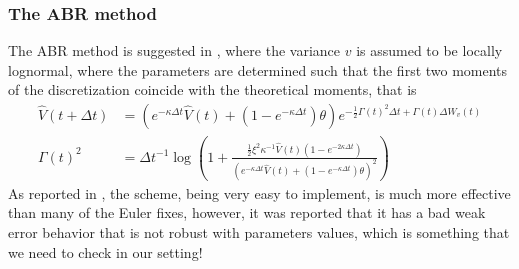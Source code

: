 \subsubsection*{The ABR method}\label{sec:The ABR method}
The ABR method is suggested in \cite{andersen2005extended}, where the
variance $v$ is assumed to be locally lognormal, where the parameters are determined such that the first two moments of the discretization coincide with the theoretical moments, that is 
\begin{align}\label{eq: vol_moment_matching}
\hat{V}(t+\Delta t)&= \left(e^{-\kappa \Delta t}  \hat{V}(t) + \left( 1-e^{-\kappa \Delta t}\right) \theta  \right) e^{-\frac{1}{2} \Gamma(t)^2 \Delta t+\Gamma(t) \Delta W_v(t)}\nonumber\\
\Gamma(t)^2 &=\Delta t^{-1} \log \left(  1+ \frac{\frac{1}{2}\xi^2 \kappa^{-1} \hat{V}(t) (1-e^{-2 \kappa \Delta t})}{\left( e^{-\kappa \Delta t} \hat{V}(t) +(1-e^{- \kappa \Delta t}) \theta \right)^2 }\right)
\end{align}
As reported in \cite{lord2010comparison}, the scheme, being very easy to implement, is much more effective than many of the Euler fixes, however, it was reported that it has a bad weak error behavior that is not robust with parameters values, which is something that we need to check in our setting!
